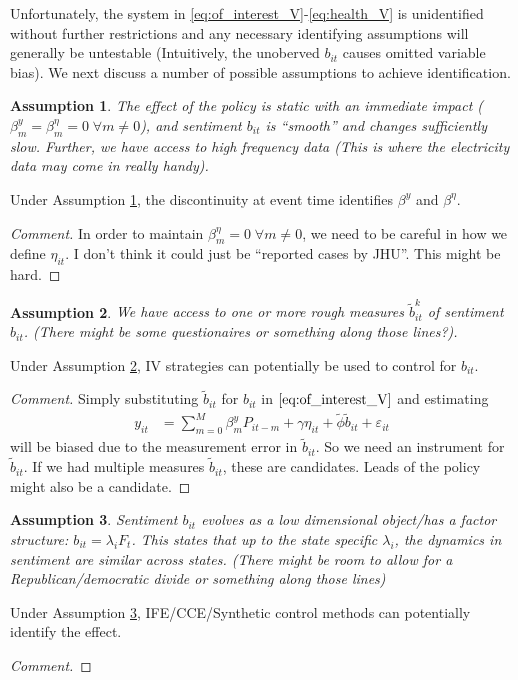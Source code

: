\documentclass{article}[12pt]
\newtheorem{ass}{Assumption}
\begin{document}
Unfortunately, the system in \eqref{eq:of_interest_V}-\eqref{eq:health_V} is unidentified without further restrictions and any necessary identifying assumptions will generally be untestable (Intuitively, the unoberved $b_{it}$ causes omitted variable bias). We next discuss a number of possible assumptions to achieve identification.
\begin{ass}\label{ass:RD}
The effect of the policy is static with an immediate impact ($\beta^y_m = \beta^\eta_m= 0 \; \forall m \ne 0$), and sentiment $b_{it}$ is ``smooth'' and changes sufficiently slow. Further, we have access to high frequency data (This is where the electricity data may come in really handy). 
\end{ass}
Under Assumption \ref{ass:RD}, the discontinuity at event time identifies $\beta^y$ and $\beta^\eta$.
\begin{proof}[Comment]
In order to maintain $\beta^\eta_m= 0 \; \forall m \ne 0$, we need to be careful in how we define $\eta_{it}$. I don't think it could just be ``reported cases by JHU''. This might be hard.
\end{proof}

\begin{ass} \label{ass:IV}
We have access to one or more rough measures $\tilde b^k_{it}$ of sentiment $b_{it}$. (There might be some questionaires or something along those lines?).
\end{ass}
Under Assumption \ref{ass:IV}, IV strategies can potentially be used to control for $b_{it}$.
\begin{proof}[Comment]
Simply substituting $\tilde b_{it}$ for $b_{it}$ in $\eqref{eq:of_interest_V}$ and estimating
\begin{align}
y_{it} &=  \sum_{m=0}^M \beta^y_m P_{it-m} + \gamma \eta_{it} + \tilde \phi \tilde b_{it} + \varepsilon_{it}
\end{align}
will be biased due to the measurement error in $\tilde b_{it}$. So we need an instrument for $\tilde b_{it}$. If we had multiple measures $\tilde b_{it}$, these are candidates. Leads of the policy might also be a candidate.
\end{proof}

\begin{ass} \label{ass:FS}
Sentiment $b_{it}$ evolves as a low dimensional object/has a factor structure: $b_{it}=\lambda_i F_t$. This states that up to the state specific $\lambda_i$, the dynamics in sentiment are similar across states. (There might be room to allow for a Republican/democratic divide or something along those lines)
\end{ass}
Under Assumption \ref{ass:FS}, IFE/CCE/Synthetic control methods can potentially identify the effect.
\begin{proof}[Comment]

\end{proof}



\end{document}
